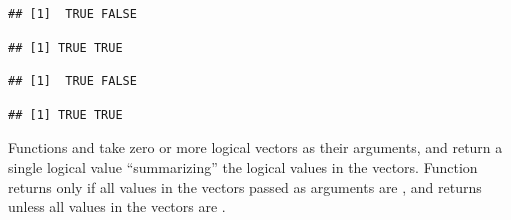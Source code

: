 \documentclass[krantz2]{krantz}\usepackage{knitr}
\begin{document}
\begin{knitrout}\footnotesize
{}\color{fgcolor}\begin{kframe}
\begin{alltt}
 \hlkwb{<-} \hlstd{(}\hlstd{,}\hlstd{)}
 \hlkwb{<-} \hlstd{(}\hlstd{,}\hlstd{)}
\end{alltt}
\begin{verbatim}
## [1]  TRUE FALSE
\end{verbatim}
\begin{alltt}
\end{alltt}
\begin{verbatim}
## [1] TRUE TRUE
\end{verbatim}
\begin{alltt}
 \hlopt{&}  
\end{alltt}
\begin{verbatim}
## [1]  TRUE FALSE
\end{verbatim}
\begin{alltt}
 \hlopt{|}  
\end{alltt}
\begin{verbatim}
## [1] TRUE TRUE
\end{verbatim}
\end{kframe}
\end{knitrout}

Functions  and  take zero or more logical vectors as their arguments, and return a single logical value ``summarizing'' the logical values in the vectors. Function  returns  only if all values in the vectors passed as arguments are , and  returns  unless all values in the vectors are .
\end{document}
